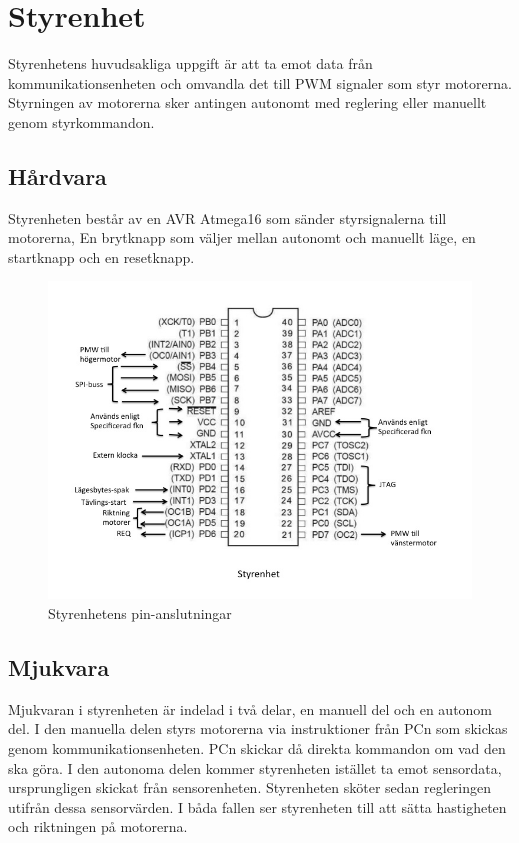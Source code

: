 \section{Styrenhet}

Styrenhetens huvudsakliga uppgift är att ta emot data från
kommunikationsenheten och omvandla det till PWM signaler som styr motorerna.
Styrningen av motorerna sker antingen autonomt med reglering eller 
manuellt genom styrkommandon.

\subsection{Hårdvara}

Styrenheten består av en AVR Atmega16 som sänder styrsignalerna till motorerna, 
En brytknapp som väljer mellan autonomt och manuellt läge, en startknapp och en 
resetknapp.  

\begin{figure}[H]
  \centering
 \includegraphics[angle=0,scale=0.5]{bilder/PIN_styr.jpg}
  \caption{Styrenhetens pin-anslutningar}
  \label{fig:PINstyr}
\end{figure}


\subsection{Mjukvara}

Mjukvaran i styrenheten är indelad i två delar, en manuell del och en autonom del.
I den manuella delen styrs motorerna via instruktioner från PCn som skickas 
genom kommunikationsenheten. PCn skickar då direkta kommandon om vad 
den ska göra. I den autonoma delen kommer styrenheten istället ta emot 
sensordata, ursprungligen skickat från sensorenheten. Styrenheten sköter sedan 
regleringen utifrån dessa sensorvärden. I båda fallen ser styrenheten till att sätta
hastigheten och riktningen på motorerna.

